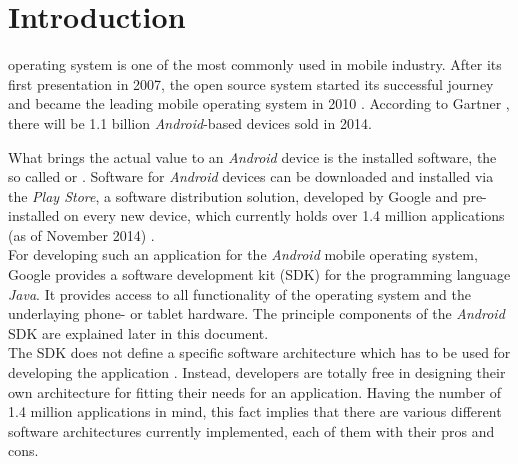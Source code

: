 \section{Introduction}

 operating system is one of the most 
commonly used in mobile industry. After its first presentation in 2007, the open source system started its successful journey and became the leading mobile operating system in 2010 \cite{PassiveMVC}. According to Gartner \cite{GartnerAndroid2014}, there will be 1.1 billion \emph{Android}-based devices sold in 2014.

What brings the actual value to an \emph{Android} device is the installed software, the so called  or 
.
Software for \emph{Android} devices can be downloaded and installed via the 
\emph{Play Store}, a software distribution solution, developed by Google and 
pre-installed on every new device, which currently holds over 1.4 million 
applications (as of November 2014) \cite{AppBrainStats}.\\


For developing such an application for the \emph{Android} mobile operating 
system, Google provides a software development kit (SDK) for the programming 
language \emph{Java}. It provides access to all functionality of the 
operating system and the underlaying phone- or tablet hardware. The principle components of the \emph{Android} SDK are explained later in this document.\\


The SDK does not define a specific software architecture which has to 
be used for developing the application \cite{AndroidDeveloperCollection}. Instead, developers are totally free in 
designing their own architecture for fitting their needs for an application.
Having the number of 1.4 million applications in mind, this fact implies that 
there are various different software architectures currently implemented, each 
of them with their pros and cons. 

